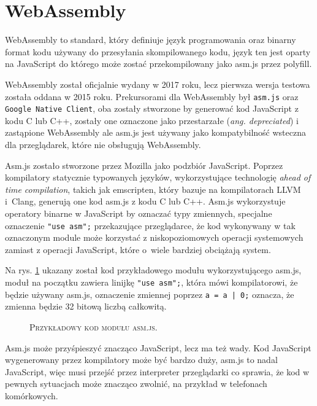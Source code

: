 \documentclass[12pt,a4paper,oneside]{book}
\newcommand{\captionT}[1]{\caption{\textsc{\footnotesize{#1}}}}
\begin{document}
\section{WebAssembly}

WebAssembly to standard, który definiuje język programowania oraz binarny format kodu używany do przesyłania skompilowanego kodu, język ten jest oparty na JavaScript do którego może zostać przekompilowany jako asm.js przez polyfill.

WebAssembly został oficjalnie wydany w 2017 roku, lecz pierwsza wersja testowa została oddana w 2015 roku. Prekursorami dla WebAssembly był \texttt{asm.js} oraz \texttt{Google Native Client}, oba zostały stworzone by generować kod JavaScript z kodu C lub C++, zostały one oznaczone jako przestarzałe (\textit{ang. depreciated}) i zastąpione WebAssembly ale asm.js jest używany jako kompatybilność wsteczna dla przeglądarek, które nie obsługują WebAssembly.

Asm.js zostało stworzone przez Mozilla jako podzbiór JavaScript. Poprzez kompilatory statycznie typowanych języków, wykorzystujące technologię \textit{ahead of time compilation}, takich jak emscripten, który bazuje na kompilatorach LLVM i~Clang, generują one kod asm.js z kodu C lub C++. Asm.js wykorzystuje operatory binarne w JavaScript by oznaczać typy zmiennych, specjalne oznaczenie \texttt{"use asm";} przekazujące przeglądarce, że kod wykonywany w tak oznaczonym module może korzystać z niskopoziomowych operacji systemowych zamiast z operacji JavaScript, które o~wiele bardziej obciążają system.

Na rys. \ref{rys_asm_js} ukazany został kod przykładowego modułu wykorzystującego asm.js, moduł na początku zawiera linijkę \texttt{"use asm";}, która mówi kompilatorowi, że będzie używany asm.js, oznaczenie zmiennej poprzez \texttt{a = a | 0;} oznacza, że zmienna będzie 32 bitową liczbą całkowitą.

\begin{figure}[H]
\centering

\captionT{Przykładowy kod modułu asm.js.}
\label{rys_asm_js}
\end{figure}

Asm.js może przyśpieszyć znacząco JavaScript, lecz ma też wady. Kod JavaScript wygenerowany przez kompilatory może być bardzo duży, asm.js to nadal JavaScript, więc musi przejść przez interpreter przeglądarki co sprawia, że kod w pewnych sytuacjach może znacząco zwolnić, na przykład w telefonach komórkowych.
\end{document}
